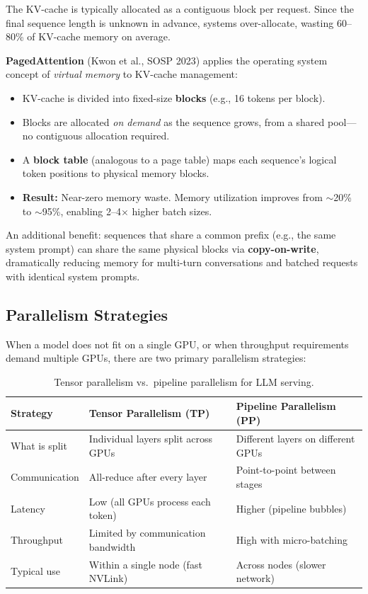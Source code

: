 The KV-cache is typically allocated as a contiguous block per request.  Since the final
sequence length is unknown in advance, systems over-allocate, wasting 60--80\% of
KV-cache memory on average.

\textbf{PagedAttention} (Kwon et al., SOSP 2023) applies the operating system concept
of \emph{virtual memory} to KV-cache management:
\begin{itemize}
    \item KV-cache is divided into fixed-size \textbf{blocks} (e.g., 16 tokens per block).
    \item Blocks are allocated \emph{on demand} as the sequence grows, from a shared
          pool---no contiguous allocation required.
    \item A \textbf{block table} (analogous to a page table) maps each sequence's
          logical token positions to physical memory blocks.
    \item \textbf{Result:} Near-zero memory waste.  Memory utilization improves from
          $\sim$20\% to $\sim$95\%, enabling 2--4$\times$ higher batch sizes.
\end{itemize}

An additional benefit: sequences that share a common prefix (e.g., the same system
prompt) can share the same physical blocks via \textbf{copy-on-write}, dramatically
reducing memory for multi-turn conversations and batched requests with identical
system prompts.

\subsection{Parallelism Strategies}
\label{sec:parallelism}

When a model does not fit on a single GPU, or when throughput requirements demand
multiple GPUs, there are two primary parallelism strategies:

\begin{table}[H]
\centering
\small
\begin{tabularx}{\textwidth}{@{}l X X@{}}
\toprule
\textbf{Strategy} & \textbf{Tensor Parallelism (TP)} & \textbf{Pipeline Parallelism (PP)} \\
\midrule
What is split & Individual layers split across GPUs & Different layers on different GPUs \\
Communication & All-reduce after every layer & Point-to-point between stages \\
Latency       & Low (all GPUs process each token) & Higher (pipeline bubbles) \\
Throughput    & Limited by communication bandwidth & High with micro-batching \\
Typical use   & Within a single node (fast NVLink) & Across nodes (slower network) \\
\bottomrule
\end{tabularx}
\caption{Tensor parallelism vs.\ pipeline parallelism for LLM serving.}
\label{tab:parallelism}
\end{table}

